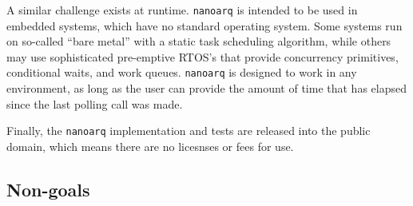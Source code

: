 \documentclass[11pt]{article}
\newcommand{\nanoarq}{\texttt{nanoarq}}
\begin{document}
\begin{description}
    A similar challenge exists at runtime. \nanoarq{} is intended to be used in embedded systems, which have no standard operating system. Some systems run on so-called \enquote{bare metal} with a static task scheduling algorithm, while others may use sophisticated pre-emptive RTOS's that provide concurrency primitives, conditional waits, and work queues. \nanoarq{} is designed to work in any environment, as long as the user can provide the amount of time that has elapsed since the last polling call was made. \par
    Finally, the \nanoarq{} implementation and tests are released into the public domain, which means there are no licesnses or fees for use.
\end{description}

\subsection{Non-goals}
\end{document}
